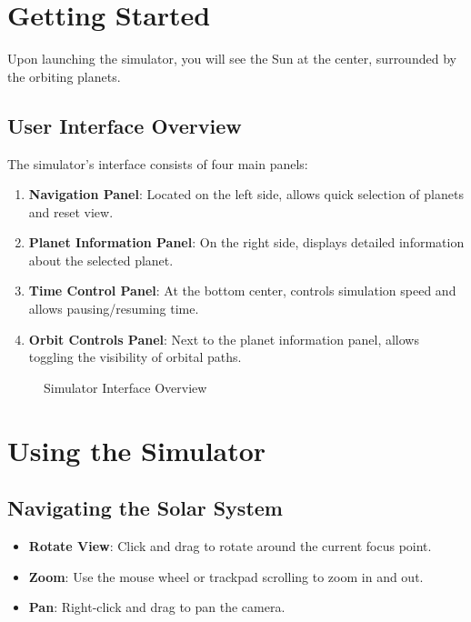 \documentclass[12pt, a4paper]{article}
\begin{document}
\section{Getting Started}

Upon launching the simulator, you will see the Sun at the center, surrounded by
the orbiting planets.

\subsection{User Interface Overview}

The simulator's interface consists of four main panels:

\begin{enumerate}
    \item \textbf{Navigation Panel}: Located on the left side, allows quick selection of planets and reset view.
    \item \textbf{Planet Information Panel}: On the right side, displays detailed information about the selected planet.
    \item \textbf{Time Control Panel}: At the bottom center, controls simulation speed and allows pausing/resuming time.
    \item \textbf{Orbit Controls Panel}: Next to the planet information panel, allows toggling the visibility of orbital paths.
\end{enumerate}

\begin{figure}[H]
    \centering
    \caption{Simulator Interface Overview}
\end{figure}

\section{Using the Simulator}

\subsection{Navigating the Solar System}

\begin{itemize}
    \item \textbf{Rotate View}: Click and drag to rotate around the current focus point.
    \item \textbf{Zoom}: Use the mouse wheel or trackpad scrolling to zoom in and out.
    \item \textbf{Pan}: Right-click and drag to pan the camera.
\end{itemize}
\end{document}
